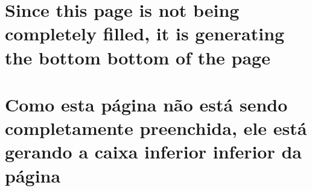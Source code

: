 


%
%


\lang
{\chapter[Appendix A]{Since this page is not being completely filled, it is generating the bottom bottom of the page}}
{\chapter[Apêndice A]{Como esta página não está sendo completamente preenchida, ele está gerando a caixa inferior inferior da página}}


